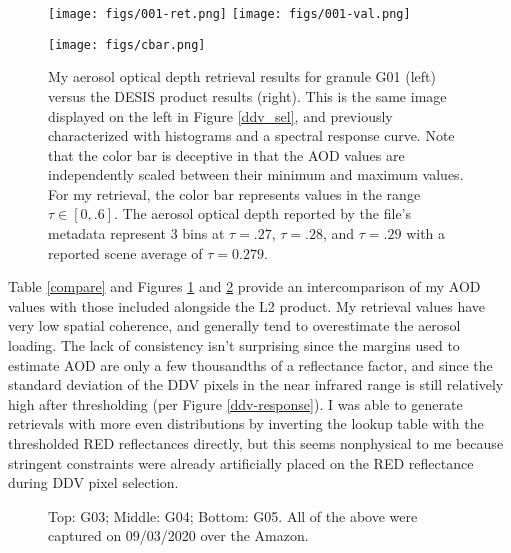 \documentclass[12pt]{article}
\begin{document}
\begin{figure}[h!]
    \centering
    \begin{center}
        \texttt{[image: figs/001-ret.png]}
        \texttt{[image: figs/001-val.png]}

        \vspace{.2em}

        \texttt{[image: figs/cbar.png]}
    \end{center}
    \caption{My aerosol optical depth retrieval results for granule G01 (left) versus the DESIS product results (right). This is the same image displayed on the left in Figure \ref{ddv_sel}, and previously characterized with histograms and a spectral response curve. Note that the color bar is deceptive in that the AOD values are independently scaled between their minimum and maximum values. For my retrieval, the color bar represents values in the range $\tau \in [0,.6]$. The aerosol optical depth reported by the file's metadata represent 3 bins at $\tau=.27$, $\tau=.28$, and $\tau=.29$ with a reported scene average of $\tau=0.279$.}
    \label{retrieval}
\end{figure}

Table \ref{compare} and Figures \ref{retrieval} and \ref{rets-2} provide an intercomparison of my AOD values with those included alongside the L2 product. My retrieval values have very low spatial coherence, and generally tend to overestimate the aerosol loading. The lack of consistency isn't surprising since the margins used to estimate AOD are only a few thousandths of a reflectance factor, and since the standard deviation of the DDV pixels in the near infrared range is still relatively high after thresholding (per Figure \ref{ddv-response}). I was able to generate retrievals with more even distributions by inverting the lookup table with the thresholded RED reflectances directly, but this seems nonphysical to me because stringent constraints were already artificially placed on the RED reflectance during DDV pixel selection.

\begin{figure}[h!]
    \centering
    \begin{center}

        \vspace{.2em}

        \vspace{.2em}
    \end{center}
    \caption{Top: G03; Middle: G04; Bottom: G05. All of the above were captured on 09/03/2020 over the Amazon.}
    \label{rets-2}
\end{figure}
\end{document}
